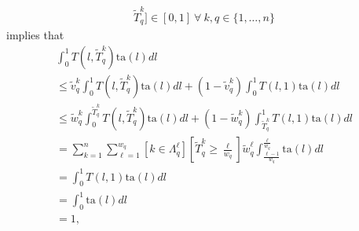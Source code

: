 \documentclass[hidelinks, nonatbib]{elsarticle}
\begin{document}
\begin{enumerate}
\begin{enumerate}
\begin{enumerate}
\begin{gather}
                    \tilde{T}_{q}^{k}
                ]
                \in [0,1]
                \
                \forall
                \
                k,q \in \{1, \dots, n\}
            \end{gather}
            implies that
            \begin{align}
                \int_{0}^{1}{
                    T(l,\tilde{T}_{q}^{k})
                    \text{ta}(l)
                    dl
                } 
                \\
                \leq
                \tilde{v}_{q}^{k}
                \int_{0}^{1}{
                    T(l,\tilde{T}_{q}^{k})
                    \text{ta}(l)
                    dl
                }
                +
                (1 - \tilde{v}_{q}^{k})
                \int_{0}^{1}{
                    T(l,1)
                    \text{ta}(l)
                    dl
                } 
                \\
                \leq
                \tilde{w}_{q}^{k}
                \int_{0}^{\tilde{T}_{q}^{k}}{
                    T(l,\tilde{T}_{q}^{k})
                    \text{ta}(l)
                    dl
                } + 
                (1 - \tilde{w}_{q}^{k})
                \int_{\tilde{T}_{q}^{k}}^{1}{
                    T(l,1)
                    \text{ta}(l)
                    dl
                }
                \\
                =
                \sum_{k=1}^{n}
                \sum_{\ell=1}^{w_q}
                \left[
                    k \in \Lambda_{q}^{\ell}
                \right]
                \left[
                    \tilde{T}_{q}^{k}
                    \geq 
                    \frac{\ell}{w_q}
                \right]
                \tilde{w}_{q}^{\ell}
                \int_{
                    \frac{\ell - 1}{w_q}
                }^{
                    \frac{\ell}{w_q}
                }{
                    \text{ta}(l)
                    dl
                }
                \\
                =
                \int_{0}^{1}{
                    T(l,1)
                    \text{ta}(l)
                    dl
                }
                \\
                =
                \int_{0}^{1}{
                    \text{ta}(l)
                    dl
                }
                \\
                =
                1
                ,
            \end{align}

\end{enumerate}
\end{enumerate}
\end{enumerate}
\end{document}
